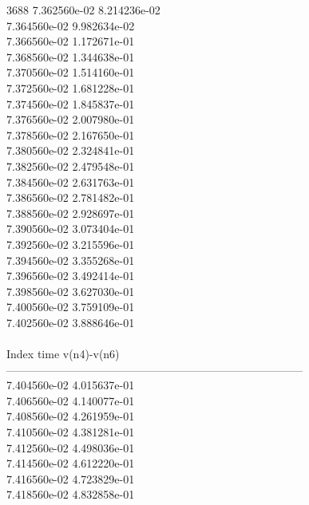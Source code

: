 3688	7.362560e-02	8.214236e-02	\\ 	7.364560e-02	9.982634e-02	\\ 	7.366560e-02	1.172671e-01	\\ 	7.368560e-02	1.344638e-01	\\ 	7.370560e-02	1.514160e-01	\\ 	7.372560e-02	1.681228e-01	\\ 	7.374560e-02	1.845837e-01	\\ 	7.376560e-02	2.007980e-01	\\ 	7.378560e-02	2.167650e-01	\\ 	7.380560e-02	2.324841e-01	\\ 	7.382560e-02	2.479548e-01	\\ 	7.384560e-02	2.631763e-01	\\ 	7.386560e-02	2.781482e-01	\\ 	7.388560e-02	2.928697e-01	\\ 	7.390560e-02	3.073404e-01	\\ 	7.392560e-02	3.215596e-01	\\ 	7.394560e-02	3.355268e-01	\\ 	7.396560e-02	3.492414e-01	\\ 	7.398560e-02	3.627030e-01	\\ 	7.400560e-02	3.759109e-01	\\ 	7.402560e-02	3.888646e-01	\\ \hline
\\ \hline
Index   time            v(n4)-v(n6)     \\ \hline
--------------------------------------------------------------------------------\\ 	7.404560e-02	4.015637e-01	\\ 	7.406560e-02	4.140077e-01	\\ 	7.408560e-02	4.261959e-01	\\ 	7.410560e-02	4.381281e-01	\\ 	7.412560e-02	4.498036e-01	\\ 	7.414560e-02	4.612220e-01	\\ 	7.416560e-02	4.723829e-01	\\ 	7.418560e-02	4.832858e-01	\\ \hline
